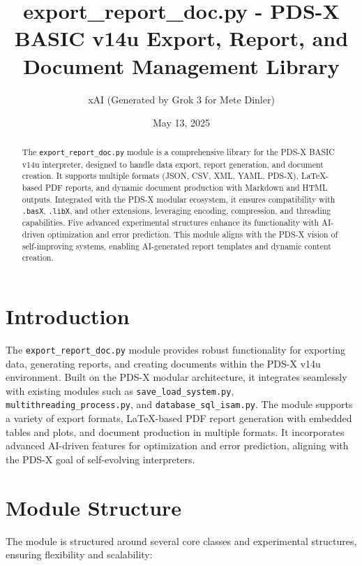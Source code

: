 \documentclass[a4paper,12pt]{article}
\title{export\_report\_doc.py - PDS-X BASIC v14u Export, Report, and Document Management Library}
\author{xAI (Generated by Grok 3 for Mete Dinler)}
\date{May 13, 2025}
\begin{document}
\maketitle

\begin{abstract}
The \texttt{export\_report\_doc.py} module is a comprehensive library for the PDS-X BASIC v14u interpreter, designed to handle data export, report generation, and document creation. It supports multiple formats (JSON, CSV, XML, YAML, PDS-X), LaTeX-based PDF reports, and dynamic document production with Markdown and HTML outputs. Integrated with the PDS-X modular ecosystem, it ensures compatibility with \texttt{.basX}, \texttt{.libX}, and other extensions, leveraging encoding, compression, and threading capabilities. Five advanced experimental structures enhance its functionality with AI-driven optimization and error prediction. This module aligns with the PDS-X vision of self-improving systems, enabling AI-generated report templates and dynamic content creation.
\end{abstract}

\tableofcontents

\section{Introduction}
The \texttt{export\_report\_doc.py} module provides robust functionality for exporting data, generating reports, and creating documents within the PDS-X v14u environment. Built on the PDS-X modular architecture, it integrates seamlessly with existing modules such as \texttt{save\_load\_system.py}, \texttt{multithreading\_process.py}, and \texttt{database\_sql\_isam.py}. The module supports a variety of export formats, LaTeX-based PDF report generation with embedded tables and plots, and document production in multiple formats. It incorporates advanced AI-driven features for optimization and error prediction, aligning with the PDS-X goal of self-evolving interpreters.

\section{Module Structure}
The module is structured around several core classes and experimental structures, ensuring flexibility and scalability:
\end{document}
